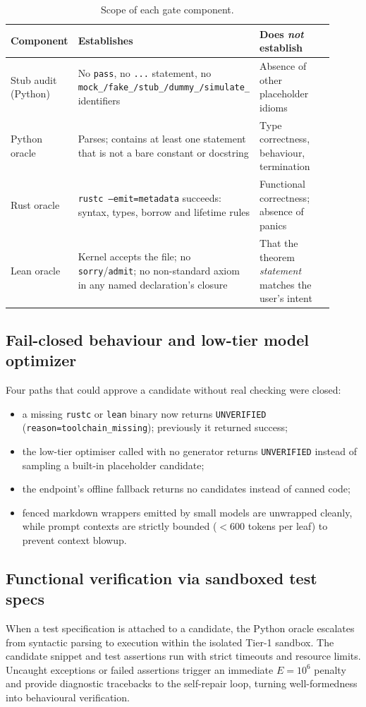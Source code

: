 \documentclass[11pt,a4paper,onecolumn]{article}
\begin{document}
\begin{table}[h]
\centering
\begin{tabular}{p{0.17\linewidth}p{0.38\linewidth}p{0.36\linewidth}}
\toprule
Component & Establishes & Does \emph{not} establish \\
\midrule
Stub audit (Python) & No \texttt{pass}, no \texttt{...} statement, no
\texttt{mock\_/fake\_/stub\_/dummy\_/simulate\_} identifiers & Absence of other placeholder idioms \\
Python oracle & Parses; contains at least one statement that is not a bare
constant or docstring & Type correctness, behaviour, termination \\
Rust oracle~\cite{rust} & \texttt{rustc --emit=metadata} succeeds: syntax, types, borrow and
lifetime rules & Functional correctness; absence of panics \\
Lean oracle~\cite{lean4} & Kernel accepts the file; no \texttt{sorry}/\texttt{admit}; no
non-standard axiom in any named declaration's closure & That the theorem
\emph{statement} matches the user's intent \\
\bottomrule
\end{tabular}
\caption{Scope of each gate component.}
\label{tab:checks}
\end{table}

\subsection{Fail-closed behaviour and low-tier model optimizer}
Four paths that could approve a candidate without real checking were closed:
\begin{itemize}
\item a missing \texttt{rustc} or \texttt{lean} binary now returns
\texttt{UNVERIFIED} (\texttt{reason=toolchain\_missing}); previously it returned success;
\item the low-tier optimiser called with no generator returns \texttt{UNVERIFIED}
instead of sampling a built-in placeholder candidate;
\item the endpoint's offline fallback returns no candidates instead of canned code;
\item fenced markdown wrappers emitted by small models are unwrapped cleanly, while
prompt contexts are strictly bounded ($<600$ tokens per leaf) to prevent context blowup.
\end{itemize}

\subsection{Functional verification via sandboxed test specs}
When a test specification is attached to a candidate, the Python oracle escalates
from syntactic parsing to execution within the isolated Tier-1 sandbox. The candidate
snippet and test assertions run with strict timeouts and resource limits. Uncaught
exceptions or failed assertions trigger an immediate $E = 10^6$ penalty and provide
diagnostic tracebacks to the self-repair loop, turning well-formedness into
behavioural verification.
\end{document}
